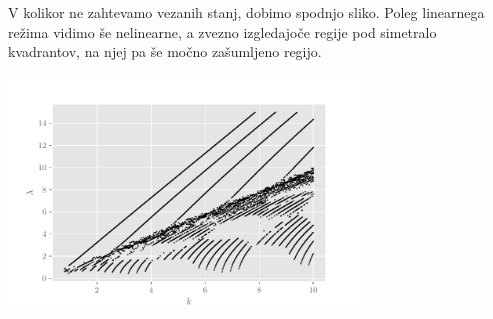 \documentclass[a4paper,oneside,12pt]{article}
\begin{document}
V kolikor ne zahtevamo vezanih stanj, dobimo spodnjo sliko. Poleg linearnega režima vidimo še nelinearne, a zvezno izgledajoče regije pod simetralo kvadrantov, na njej pa še močno zašumljeno regijo.
\begin{center}
     \includegraphics[width=0.7\textwidth]{../old/2021_disperzija_vsi.pdf}
\end{center}
\end{document}
